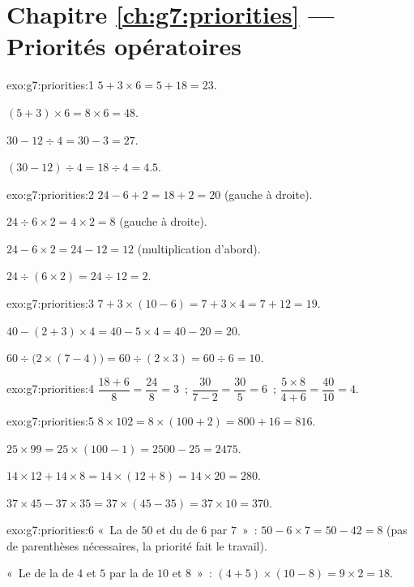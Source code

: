 \section*{Chapitre \ref{ch:g7:priorities} --- Priorités opératoires}

\begin{solution}{exo:g7:priorities:1}
$5 + 3 \times 6 = 5 + 18 = 23$.

$(5 + 3) \times 6 = 8 \times 6 = 48$.

$30 - 12 \div 4 = 30 - 3 = 27$.

$(30 - 12) \div 4 = 18 \div 4 = 4.5$.
\end{solution}

\begin{solution}{exo:g7:priorities:2}
$24 - 6 + 2 = 18 + 2 = 20$ (gauche à droite).

$24 \div 6 \times 2 = 4 \times 2 = 8$ (gauche à droite).

$24 - 6 \times 2 = 24 - 12 = 12$ (multiplication d'abord).

$24 \div (6 \times 2) = 24 \div 12 = 2$.
\end{solution}

\begin{solution}{exo:g7:priorities:3}
$7 + 3 \times (10 - 6) = 7 + 3 \times 4 = 7 + 12 = 19$.

$40 - (2 + 3) \times 4 = 40 - 5 \times 4 = 40 - 20 = 20$.

$60 \div \bigl(2 \times (7 - 4)\bigr) = 60 \div (2 \times 3)
= 60 \div 6 = 10$.
\end{solution}

\begin{solution}{exo:g7:priorities:4}
$\dfrac{18 + 6}{8} = \dfrac{24}{8} = 3$~; \quad
$\dfrac{30}{7 - 2} = \dfrac{30}{5} = 6$~; \quad
$\dfrac{5 \times 8}{4 + 6} = \dfrac{40}{10} = 4$.
\end{solution}

\begin{solution}{exo:g7:priorities:5}
$8 \times 102 = 8 \times (100 + 2) = 800 + 16 = 816$.

$25 \times 99 = 25 \times (100 - 1) = 2500 - 25 = 2475$.

$14 \times 12 + 14 \times 8 = 14 \times (12 + 8) = 14 \times 20 = 280$.

$37 \times 45 - 37 \times 35 = 37 \times (45 - 35) = 37 \times 10 =
370$.
\end{solution}

\begin{solution}{exo:g7:priorities:6}
«~La  de $50$ et du  de $6$ par $7$~»~:
$50 - 6 \times 7 = 50 - 42 = 8$ (pas de parenthèses nécessaires, la
priorité fait le travail).

«~Le  de la  de $4$ et $5$ par la  de $10$ et
$8$~»~: $(4 + 5) \times (10 - 8) = 9 \times 2 = 18$.
\end{solution}

